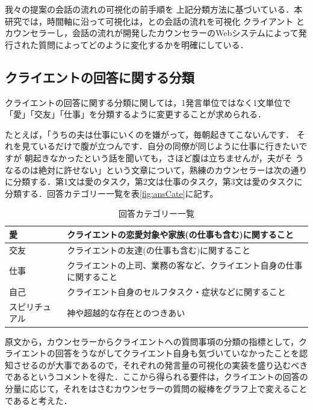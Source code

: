 \documentclass[shuuron]{kuee}
\begin{document}
我々の提案の会話の流れの可視化の前手順を 上記分類方法に基づいている．本研究では，時間軸に沿って可視化は，との会話の流れを可視化 クライアント とカウンセラーし，会話の流れが開発したカウンセラーのWebシステムによって発行された質問によってどのように変化するかを明確にしている．


\subsection{クライエントの回答に関する分類}



クライエントの回答に関する分類に関しては，1発言単位ではなく1文単位で「愛」「交友」「仕事」を分類するように変更することが求められる．

たとえば，「うちの夫は仕事にいくのを嫌がって，毎朝起きてこないんです．
それを見ているだけで腹が立つんです．自分の同僚が同じように仕事に行きたいですが
朝起きなかったという話を聞いても，さほど腹は立ちませんが，夫がそ
うなるのは絶対に許せない」という文章について，熟練のカウンセラーは次の通りに分類する．第1文は愛のタスク，第2文は仕事のタスク，第3文は愛のタスクに分類する．回答カテゴリー一覧を表\ref{fig:ansCate}に記す。

\begin{table}
  \caption{回答カテゴリー一覧}
  \label{table:ansCate}
  \begin{center}
    \begin{tabular}{|l|p{7cm}|} \hline
      愛 & クライエントの恋愛対象や家族(の仕事も含む)に関すること

      \\ \hline
      交友  & クライエントの友達(の仕事も含む)に関すること

      \\ \hline
      仕事 & クライエントの上司、業務の客など、クライエント自身の仕事に関すること

      \\ \hline
      自己  &  クライエント自身のセルフタスク・症状などに関すること
      \\ \hline
      スピリチュアル & 神や超越的な存在とのつきあい
      \\ \hline
    \end{tabular}
  \end{center}
\end{table}


原文から，カウンセラーからクライエントへの質問事項の分類の指標として，クライエントの回答をうながしてクライエント自身も気づいていなかったことを認知させるのが大事であるので，それぞれの発言量の可視化の実装を盛り込むべきであるというコメントを得た．ここから得られる要件は，クライエントの回答の分量に応じて，それをはさむカウンセラーの質問の縦棒をグラフ上で変えることであると考えた．
\end{document}

